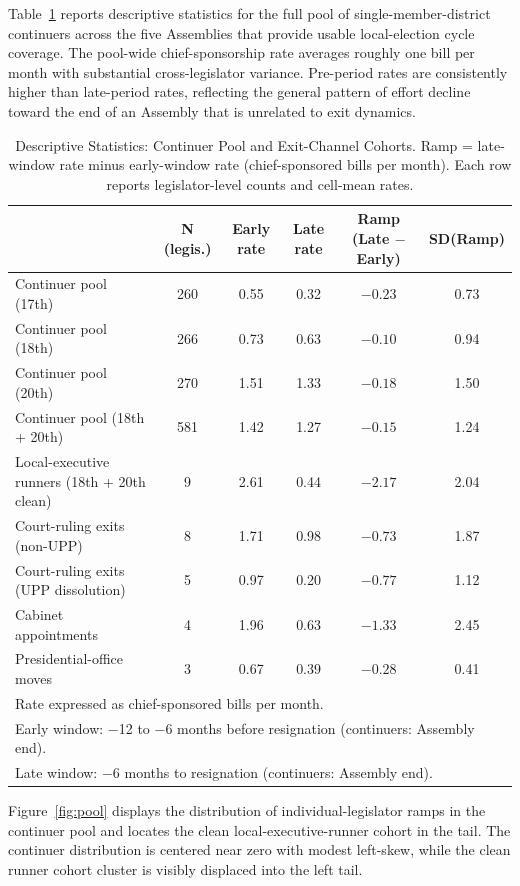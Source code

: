\documentclass[11pt]{article}
\begin{document}
Table~\ref{tab:desc} reports descriptive statistics for the full pool of single-member-district continuers across the five Assemblies that provide usable local-election cycle coverage. The pool-wide chief-sponsorship rate averages roughly one bill per month with substantial cross-legislator variance. Pre-period rates are consistently higher than late-period rates, reflecting the general pattern of effort decline toward the end of an Assembly that is unrelated to exit dynamics.

\begin{table}[H]
\centering
\caption{Descriptive Statistics: Continuer Pool and Exit-Channel Cohorts. Ramp = late-window rate minus early-window rate (chief-sponsored bills per month). Each row reports legislator-level counts and cell-mean rates.}
\label{tab:desc}
\begin{tabular}{lccccc}
\toprule
 & N (legis.) & Early rate & Late rate & Ramp (Late $-$ Early) & SD(Ramp) \\
\midrule
Continuer pool (17th) & 260 & 0.55 & 0.32 & $-0.23$ & 0.73 \\
Continuer pool (18th) & 266 & 0.73 & 0.63 & $-0.10$ & 0.94 \\
Continuer pool (20th) & 270 & 1.51 & 1.33 & $-0.18$ & 1.50 \\
Continuer pool (18th + 20th) & 581 & 1.42 & 1.27 & $-0.15$ & 1.24 \\
Local-executive runners (18th + 20th clean) & 9 & 2.61 & 0.44 & $-2.17$ & 2.04 \\
Court-ruling exits (non-UPP) & 8 & 1.71 & 0.98 & $-0.73$ & 1.87 \\
Court-ruling exits (UPP dissolution) & 5 & 0.97 & 0.20 & $-0.77$ & 1.12 \\
Cabinet appointments & 4 & 1.96 & 0.63 & $-1.33$ & 2.45 \\
Presidential-office moves & 3 & 0.67 & 0.39 & $-0.28$ & 0.41 \\
\bottomrule
\multicolumn{6}{l}{\footnotesize Rate expressed as chief-sponsored bills per month.} \\
\multicolumn{6}{l}{\footnotesize Early window: $-$12 to $-$6 months before resignation (continuers: Assembly end).} \\
\multicolumn{6}{l}{\footnotesize Late window: $-$6 months to resignation (continuers: Assembly end).} \\
\end{tabular}
\end{table}

Figure~\ref{fig:pool} displays the distribution of individual-legislator ramps in the continuer pool and locates the clean local-executive-runner cohort in the tail. The continuer distribution is centered near zero with modest left-skew, while the clean runner cohort cluster is visibly displaced into the left tail.
\end{document}
